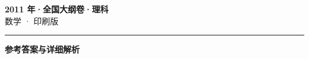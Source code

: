 \documentclass[zihao=5, a4paper]{ctexart}
\begin{document}
\begin{center}
  {\Large\bfseries 2011 年·全国大纲卷·理科}\\[4pt]
  {\large 数学 · 印刷版}
\end{center}
\medskip
{}

\par\bigskip\hrule\bigskip
{}
\begin{center}{\large\bfseries 参考答案与详细解析}\end{center}
\smallskip

\end{document}
